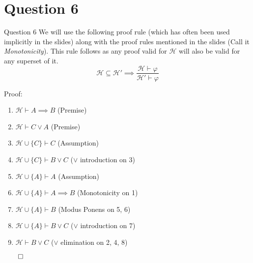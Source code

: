 \documentclass{beamer}
\begin{document}
    \section{Question 6}
    {
        \begin{frame}{Question 6}
            We will use the following proof rule (which has often been used implicitly in the slides) along with the proof rules mentioned in the slides (Call it \textit{Monotonicity}). This rule follows as any proof valid for $\mathcal{H}$ will also be valid for any superset of it.
            \begin{equation*}
                \mathcal{H} \subseteq \mathcal{H}' \implies \frac{\mathcal{H} \vdash \varphi}{\mathcal{H}' \vdash \varphi}
            \end{equation*}

            Proof:
            \begin{enumerate}
                \item $\mathcal{H} \vdash A \implies B$ (Premise)
                \item $\mathcal{H} \vdash C \lor A$ (Premise)
                \item $\mathcal{H} \cup \{C\} \vdash C$ (Assumption)
                \item $\mathcal{H} \cup \{C\} \vdash B \lor C$ ($\lor$ introduction on 3)
                \item $\mathcal{H} \cup \{A\} \vdash A$ (Assumption)
                \item $\mathcal{H} \cup \{A\} \vdash A \implies B$ (Monotonicity on 1)
                \item $\mathcal{H} \cup \{A\} \vdash B$ (Modus Ponens on 5, 6)
                \item $\mathcal{H} \cup \{A\} \vdash B \lor C$ ($\lor$ introduction on 7)
                \item $\mathcal{H} \vdash B \lor C$ ($\lor$ elimination on 2, 4, 8)
            \end{enumerate}
            $\qed$
        \end{frame}
    }
\end{document}
